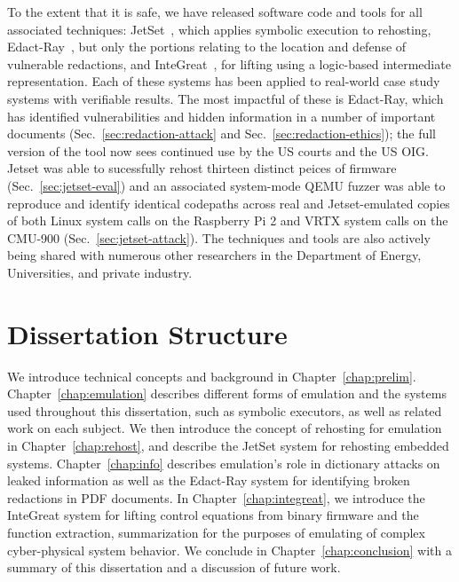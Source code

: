 To the extent that it is safe, we have released software code and tools for all associated techniques: JetSet~\cite{jetsetsource}, which applies symbolic execution to rehosting, Edact-Ray~\cite{deredactionsource}, but only the portions relating to the location and defense of vulnerable redactions, and InteGreat~\cite{bland2023integreat}, for lifting using a logic-based intermediate representation.
Each of these systems has been applied to real-world case study systems with verifiable results.
The most impactful of these is Edact-Ray, which has identified vulnerabilities and hidden information in a number of important documents (Sec.~\ref{sec:redaction-attack} and Sec.~\ref{sec:redaction-ethics}); the full version of the tool now sees continued use by the US courts and the US OIG.
Jetset was able to sucessfully rehost thirteen distinct peices of firmware (Sec.~\ref{sec:jetset-eval}) and an associated system-mode QEMU fuzzer was able to reproduce and identify identical codepaths across real and Jetset-emulated copies of both Linux system calls on the Raspberry Pi 2 and VRTX system calls on the CMU-900 (Sec.~\ref{sec:jetset-attack}).
The techniques and tools are also actively being shared with numerous other researchers in the Department of Energy, Universities, and private industry.

\section{Dissertation Structure}

We introduce technical concepts and background in Chapter~\ref{chap:prelim}.
Chapter~\ref{chap:emulation} describes different forms of emulation and the systems used throughout this dissertation, such as symbolic executors, as well as related work on each subject.
We then introduce the concept of rehosting for emulation in Chapter~\ref{chap:rehost}, and describe the JetSet system for rehosting embedded systems.
Chapter~\ref{chap:info} describes emulation's role in dictionary attacks on leaked information as well as the Edact-Ray system for identifying broken redactions in PDF documents.
In Chapter~\ref{chap:integreat}, we introduce the InteGreat system for lifting control equations from binary firmware and the function extraction, summarization for the purposes of emulating of complex cyber-physical system behavior.
We conclude in Chapter~\ref{chap:conclusion} with a summary of this dissertation and a discussion of future work.
